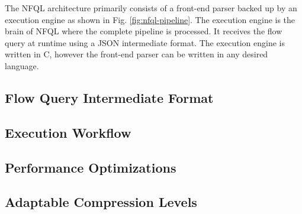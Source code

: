 The \ac{NFQL} architecture primarily consists of a front-end parser backed up
by an execution engine as shown in Fig. \ref{fig:nfql-pipeline}. The execution
engine is the brain of \ac{NFQL} where the complete pipeline is processed. It
receives the flow query at runtime using a JSON intermediate format. The
execution engine is written in C, however the front-end parser can be written
in any desired language.


\subsection{Flow Query Intermediate Format}

\label{subsec:intermediate-format}

\subsection{Execution Workflow}

\label{subsec:execution-workflow}

\subsection{Performance Optimizations}

\label{subsec:performance-optimizations}

\subsection{Adaptable Compression Levels}

\label{subsec:adaptable-compression-levels}
